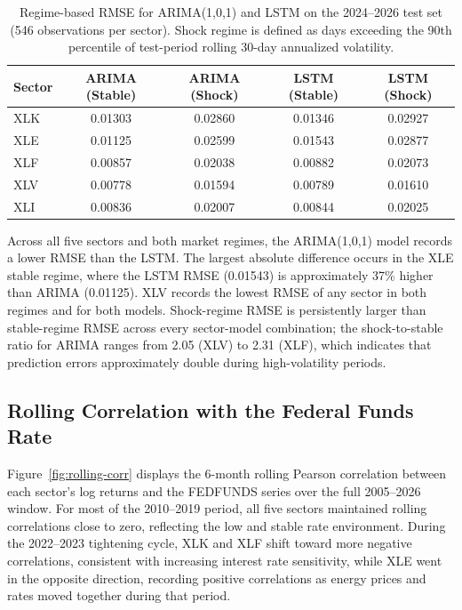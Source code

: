 \documentclass[12pt]{article}
\begin{document}
\begin{table}[H]
\centering
\caption{Regime-based RMSE for ARIMA(1,0,1) and LSTM on the 2024--2026 test set (546 observations per sector). Shock regime is defined as days exceeding the 90th percentile of test-period rolling 30-day annualized volatility.}
\label{tab:regime_rmse}
\begin{tabular}{lcccc}
\toprule
\textbf{Sector} & \textbf{ARIMA (Stable)} & \textbf{ARIMA (Shock)} & \textbf{LSTM (Stable)} & \textbf{LSTM (Shock)} \\
\midrule
XLK & 0.01303 & 0.02860 & 0.01346 & 0.02927 \\
XLE & 0.01125 & 0.02599 & 0.01543 & 0.02877 \\
XLF & 0.00857 & 0.02038 & 0.00882 & 0.02073 \\
XLV & 0.00778 & 0.01594 & 0.00789 & 0.01610 \\
XLI & 0.00836 & 0.02007 & 0.00844 & 0.02025 \\
\bottomrule
\end{tabular}
\end{table}

\noindent Across all five sectors and both market regimes, the ARIMA(1,0,1) model records a lower RMSE than the LSTM. The largest absolute difference occurs in the XLE stable regime, where the LSTM RMSE (0.01543) is approximately 37\% higher than ARIMA (0.01125). XLV records the lowest RMSE of any sector in both regimes and for both models. Shock-regime RMSE is persistently larger than stable-regime RMSE across every sector-model combination; the shock-to-stable ratio for ARIMA ranges from 2.05 (XLV) to 2.31 (XLF), which indicates that prediction errors approximately double during high-volatility periods.

\subsection{Rolling Correlation with the Federal Funds Rate}

Figure~\ref{fig:rolling-corr} displays the 6-month rolling Pearson correlation between each sector's log returns and the FEDFUNDS series over the full 2005--2026 window. For most of the 2010--2019 period, all five sectors maintained rolling correlations close to zero, reflecting the low and stable rate environment. During the 2022--2023 tightening cycle, XLK and XLF shift toward more negative correlations, consistent with increasing interest rate sensitivity, while XLE went in the opposite direction, recording positive correlations as energy prices and rates moved together during that period.
\end{document}
